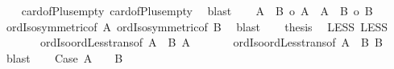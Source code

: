 \begin{isabellebody}
\ \ \isamarkupfalse%
\ card{\isacharunderscore}{\kern0pt}of{\isacharunderscore}{\kern0pt}Plus{\isacharunderscore}{\kern0pt}empty{}\ card{\isacharunderscore}{\kern0pt}of{\isacharunderscore}{\kern0pt}Plus{\isacharunderscore}{\kern0pt}empty{}\ \isamarkupfalse%
\ blast\isanewline
\ \ \isamarkupfalse%
\ {\isachardoublequoteopen}{\isacharbar}{\kern0pt}A\ {\isacharless}{\kern0pt}{\isacharplus}{\kern0pt}{\isachargreater}{\kern0pt}\ B{\isacharbar}{\kern0pt}\ {\isacharequal}{\kern0pt}o\ {\isacharbar}{\kern0pt}A{\isacharbar}{\kern0pt}\ {\isasymor}\ {\isacharbar}{\kern0pt}A\ {\isacharless}{\kern0pt}{\isacharplus}{\kern0pt}{\isachargreater}{\kern0pt}\ B{\isacharbar}{\kern0pt}\ {\isacharequal}{\kern0pt}o\ {\isacharbar}{\kern0pt}B{\isacharbar}{\kern0pt}{\isachardoublequoteclose}\isanewline
\ \ \isamarkupfalse%
\ ordIso{\isacharunderscore}{\kern0pt}symmetric{\isacharbrackleft}{\kern0pt}of\ {\isachardoublequoteopen}{\isacharbar}{\kern0pt}A{\isacharbar}{\kern0pt}{\isachardoublequoteclose}{\isacharbrackright}{\kern0pt}\ ordIso{\isacharunderscore}{\kern0pt}symmetric{\isacharbrackleft}{\kern0pt}of\ {\isachardoublequoteopen}{\isacharbar}{\kern0pt}B{\isacharbar}{\kern0pt}{\isachardoublequoteclose}{\isacharbrackright}{\kern0pt}\ \isamarkupfalse%
\ blast\isanewline
\ \ \isamarkupfalse%
\ {\isacharquery}{\kern0pt}thesis\ \isamarkupfalse%
\ LESS{}\ LESS{}\isanewline
\ \ \ \ \ \ \ ordIso{\isacharunderscore}{\kern0pt}ordLess{\isacharunderscore}{\kern0pt}trans{\isacharbrackleft}{\kern0pt}of\ {\isachardoublequoteopen}{\isacharbar}{\kern0pt}A\ {\isacharless}{\kern0pt}{\isacharplus}{\kern0pt}{\isachargreater}{\kern0pt}\ B{\isacharbar}{\kern0pt}{\isachardoublequoteclose}\ {\isachardoublequoteopen}{\isacharbar}{\kern0pt}A{\isacharbar}{\kern0pt}{\isachardoublequoteclose}{\isacharbrackright}{\kern0pt}\isanewline
\ \ \ \ \ \ \ ordIso{\isacharunderscore}{\kern0pt}ordLess{\isacharunderscore}{\kern0pt}trans{\isacharbrackleft}{\kern0pt}of\ {\isachardoublequoteopen}{\isacharbar}{\kern0pt}A\ {\isacharless}{\kern0pt}{\isacharplus}{\kern0pt}{\isachargreater}{\kern0pt}\ B{\isacharbar}{\kern0pt}{\isachardoublequoteclose}\ {\isachardoublequoteopen}{\isacharbar}{\kern0pt}B{\isacharbar}{\kern0pt}{\isachardoublequoteclose}{\isacharbrackright}{\kern0pt}\ \isamarkupfalse%
\ blast\isanewline
{}\isamarkupfalse%
\isanewline
\ \ \isamarkupfalse%
\ Case{}{\isacharcolon}{\kern0pt}\ {\isachardoublequoteopen}{\isasymnot}{\isacharparenleft}{\kern0pt}A\ {\isacharequal}{\kern0pt}\ {\isacharbraceleft}{\kern0pt}{\isacharbraceright}{\kern0pt}\ {\isasymor}\ B\ {\isacharequal}{\kern0pt}\ {\isacharbraceleft}{\kern0pt}{\isacharbraceright}{\kern0pt}{\isacharparenright}{\kern0pt}{\isachardoublequoteclose}\isanewline

\end{isabellebody}
